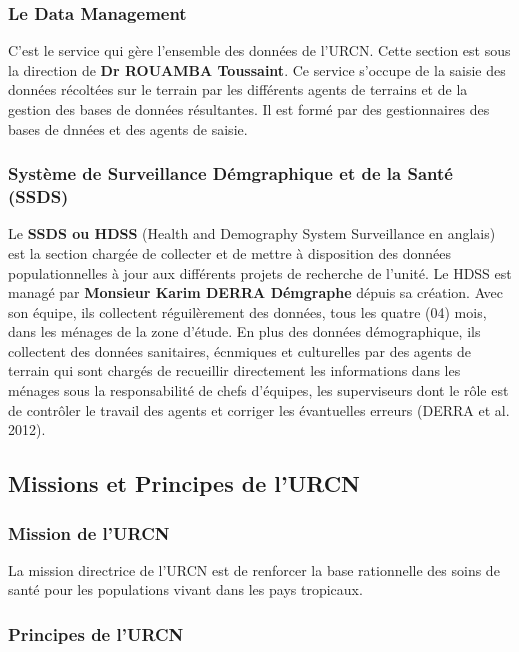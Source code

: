 \documentclass[12pt,a4paper]{report}
\begin{document}
				\subsubsection{Le Data Management}
				
				C'est le service qui gère l'ensemble des données de l'URCN. Cette section est sous la direction de \textbf{Dr ROUAMBA Toussaint}. Ce service s'occupe de la saisie des données récoltées sur le terrain par les différents agents de terrains et de la gestion des bases de données résultantes. Il est formé par des gestionnaires des bases de dnnées et des agents de saisie.
				
				\subsubsection{Système de Surveillance Démgraphique et de la Santé (SSDS)}
				
				Le \textbf{SSDS ou HDSS} (Health and Demography System Surveillance en anglais) est la section chargée de collecter et de mettre à disposition des données populationnelles à jour aux différents projets de recherche de l'unité. Le HDSS est managé par \textbf{Monsieur Karim DERRA Démgraphe} dépuis sa création. Avec son équipe, ils collectent réguilèrement des données, tous les quatre (04) mois, dans les ménages de la zone d'étude. En plus des données démographique, ils collectent des données sanitaires, écnmiques et culturelles par des agents de terrain qui sont chargés de recueillir directement les informations dans les ménages sous la responsabilité de chefs d'équipes, les superviseurs dont le rôle est de contrôler le travail des agents et corriger les  évantuelles erreurs (DERRA et al. 2012).
				
			\subsection{Missions et Principes de l'URCN}
				\subsubsection{Mission de l'URCN}
				
				La mission directrice de l'URCN est de renforcer la base rationnelle des soins de santé pour les populations vivant dans les pays tropicaux.
				
				\subsubsection{Principes de l'URCN}
				
				
				
		\printbibliography	
		\newpage
		\tableofcontents              %
\end{document}
